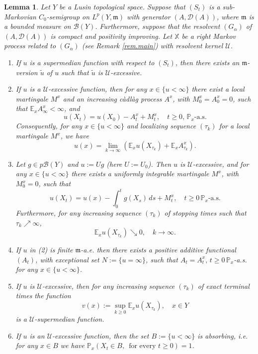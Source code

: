 \documentclass[11pt,a4paper,reqno]{amsart}
\newtheorem{lemma}[theorem]{\bf Lemma}
\theoremstyle{definition}
\numberwithin{equation}{section}
\begin{document}
\begin{lemma}
\label{lm.basic}
Let $Y$ be a  Lusin topological space. Suppose that $(S_t)$ is a sub-Markovian $C_0$-semigroup on  
$L^p(Y,\mathfrak m)$ with  generator $(A,\mathscr D(A))$, where  $\mathfrak m$ is a bounded measure on $\mathcal B(Y)$.  
Furthermore, suppose that the resolvent $(G_\alpha)$  of $(A,\mathscr D(A))$  is compact and positivity improving.
Let $\mathbb X$ be a right Markov process related to  $(G_\alpha)$ (see Remark \ref{rem.main}) 
with resolvent kernel $\mathcal U$.  
\begin{enumerate}
\item[(1)]  If $u$ is a supermedian function with respect to $(S_t)$, then there exists an $\mathfrak m$-version $\tilde u$
of $u$ such that $\tilde u$ is $\mathcal U$-excessive.
\item[(2)] If $u$ is a $\mathcal U$-excessive function, then for any $x\in \{u<\infty\}$ there exist
a local martingale $M^x$ and an increasing c\`adl\`ag process $A^x$, with $M^x_0=A^x_0=0$, such that
$\mathbb E_x A^x_\infty<\infty$, and 
\[
u(X_t)=u(X_0)-A^x_t+M^x_t,\quad t\ge 0,\, \mathbb P_x\text{-a.s.}
\]
Consequently, for any $x\in \{u<\infty\}$ and localizing sequence $(\tau_k)$ for a local martingale $M^x$, we have
\[
u(x)=\lim_{k\to \infty} (\mathbb E_xu(X_{\tau_k})+\mathbb E_xA^x_{\tau_k}).
\]
\item[(3)] Let   $g\in p\mathcal B(Y)$ and   $u:= Ug$ (here $U:=U_0$).
Then $u$ is  $\mathcal U$-excessive,  and  for any $x\in\{u<\infty\}$
there exists a uniformly integrable martingale $M^x$, with $M^x_0=0$, such that  
\begin{equation}
\label{eq.marun1}
u(X_t)=u(x)-\int_0^tg(X_s)\,ds+M^x_t,\quad t\ge 0\,\mathbb P_x\text{-a.s.}
\end{equation}
Furthermore, for any increasing sequence $(\tau_k)$ of stopping times such that $\tau_k\nearrow \infty$,
\[
\mathbb E_xu(X_{\tau_k})\searrow 0,\quad k\to \infty.
\]
\item[(4)] If $u$ in (2) is finite $\mathfrak m$-a.e. then there exists a positive  additive functional 
$(A_t)$, with exceptional set $N:=\{u=\infty\}$, such that
$A_t=A^x_t,\, t\ge 0\, \mathbb P_x$-a.s. for any  $x\in \{u<\infty\}$.
\item[(5)]  If $u$ is $\mathcal U$-excessive, then for any increasing sequence $(\tau_k)$ of exact terminal  times the function
\[
v(x):=\sup_{k\ge 0} \mathbb E_x u(X_{\tau_k}),\quad x\in Y
\]
is a $\mathcal U$-supermedian function.
\item[(6)] If $u$ is an  $\mathcal U$-excessive function, then the set $B:=\{u<\infty\}$ is absorbing, i.e.
for any $x\in B$ we have $\mathbb P_x(X_t\in B,\,\text{ for every } t\ge 0)=1$.
\end{enumerate}
\end{lemma}
\end{document}
